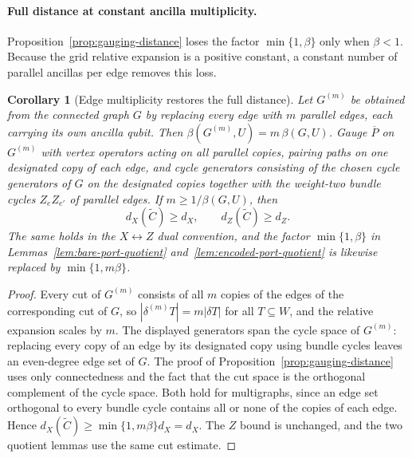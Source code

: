 \documentclass[aps,prx,reprint,superscriptaddress,nofootinbib,floatfix,longbibliography]{revtex4-2}
\newtheorem{corollary}[theorem]{Corollary}
\theoremstyle{definition}
\begin{document}
\paragraph{Full distance at constant ancilla multiplicity.}
Proposition~\ref{prop:gauging-distance} loses the factor $\min\{1,\beta\}$
only when $\beta<1$.  Because the grid relative expansion is a positive
constant, a constant number of parallel ancillas per edge removes this loss.

\begin{corollary}[Edge multiplicity restores the full distance]
\label{cor:edge-multiplicity}
Let $G^{(m)}$ be obtained from the connected graph $G$ by replacing every
edge with $m$ parallel edges, each carrying its own ancilla qubit.  Then
$\beta(G^{(m)},U)=m\,\beta(G,U)$.  Gauge $\overline P$ on $G^{(m)}$ with
vertex operators acting on all parallel copies, pairing paths on one
designated copy of each edge, and cycle generators consisting of the chosen
cycle generators of $G$ on the designated copies together with the
weight-two bundle cycles $Z_eZ_{e'}$ of parallel edges.  If
$m\geq1/\beta(G,U)$, then
\begin{equation}
 d_X(\widetilde C)\geq d_X,\qquad d_Z(\widetilde C)\geq d_Z.
 \label{eq:full-distance}
\end{equation}
The same holds in the $X\leftrightarrow Z$ dual convention, and the factor
$\min\{1,\beta\}$ in Lemmas~\ref{lem:bare-port-quotient}
and~\ref{lem:encoded-port-quotient} is likewise replaced by
$\min\{1,m\beta\}$.
\end{corollary}

\begin{proof}
Every cut of $G^{(m)}$ consists of all $m$ copies of the edges of the
corresponding cut of $G$, so $|\delta^{(m)}T|=m|\delta T|$ for all
$T\subseteq W$, and the relative expansion scales by $m$.  The displayed
generators span the cycle space of $G^{(m)}$: replacing every copy of an edge
by its designated copy using bundle cycles leaves an even-degree edge set of
$G$.  The proof of Proposition~\ref{prop:gauging-distance} uses only
connectedness and the fact that the cut space is the orthogonal complement of
the cycle space.  Both hold for multigraphs, since an edge set orthogonal to
every bundle cycle contains all or none of the copies of each edge.  Hence
$d_X(\widetilde C)\geq\min\{1,m\beta\}d_X=d_X$.  The $Z$ bound is unchanged,
and the two quotient lemmas use the same cut estimate.
\end{proof}
\end{document}
